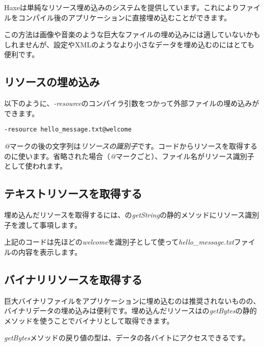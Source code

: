 Haxeは単純なリソース埋め込みのシステムを提供しています。これによりファイルをコンパイル後のアプリケーションに直接埋め込むことができます。

この方法は画像や音楽のような巨大なファイルの埋め込みには適していないかもしれませんが、設定やXMLのようなより小さなデータを埋め込むのにはとても便利です。

\subsection{リソースの埋め込み}
\label{cr-resources-embed}

以下のように、\emph{-resource}のコンパイラ引数をつかって外部ファイルの埋め込みができます。

\begin{lstlisting}
-resource hello_message.txt@welcome
\end{lstlisting}

\emph{@}マークの後の文字列は\emph{リソースの識別子}です。コードからリソースを取得するのに使います。省略された場合（\emph{@}マークごと）、ファイル名がリソース識別子として使われます。

\subsection{テキストリソースを取得する}
\label{cr-resources-getString}

埋め込んだリソースを取得するには、の\emph{getString}の静的メソッドにリソース識別子を渡して事項します。


上記のコードは先ほどの\emph{welcome}を識別子として使って\emph{hello_message.txt}ファイルの内容を表示します。

\subsection{バイナリリソースを取得する}
\label{cr-resources-getBytes}

巨大バイナリファイルをアプリケーションに埋め込むのは推奨されないものの、バイナリデータの埋め込みは便利です。埋め込んだリソースはの\emph{getBytes}の静的メソッドを使うことでバイナリとして取得できます。


\emph{getBytes}メソッドの戻り値の型は、データの各バイトにアクセスできるです。

